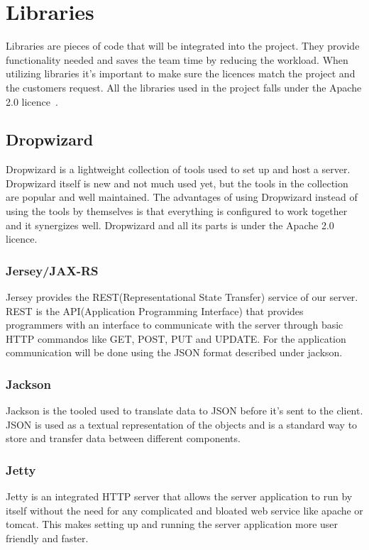 \section{Libraries}
Libraries are pieces of code that will be integrated into the project. They provide functionality needed and saves the team time by reducing the workload. When utilizing libraries it’s important to make sure the licences match the project and the customers request. All the libraries used in the project falls under the Apache 2.0 licence~\cite{apache}.

\subsection{Dropwizard}
Dropwizard is a lightweight collection of tools used to set up and host a server. Dropwizard itself is new and not much used yet, but the tools in the collection are popular and well maintained. The advantages of using Dropwizard instead of using the tools by themselves is that everything is configured to work together and it synergizes well.
Dropwizard and all its parts is under the Apache 2.0 licence. 

\subsubsection{Jersey/JAX-RS}
Jersey provides the REST(Representational State Transfer) service of our server. REST is the API(Application Programming Interface) that provides programmers with an interface to communicate with the server through basic HTTP commandos like GET, POST, PUT and UPDATE. For the application communication will be done using the JSON format described under jackson.

\subsubsection{Jackson}
Jackson is the tooled used to translate data to JSON before it’s sent to the client. JSON is used as a textual representation of the objects and is a standard way to store and transfer data between different components.

\subsubsection{Jetty}
Jetty is an integrated HTTP server that allows the server application to run by itself without the need for any  complicated and bloated web service like apache or tomcat. This makes setting up and running the server application more user friendly and faster.

